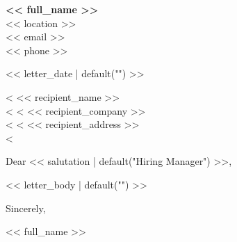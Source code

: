 \documentclass[11pt,a4paper]{article}
\begin{document}
\begin{flushleft}
{\large\bfseries << full_name >>}\\[2pt]
<< location >>\\
<< email >>\\
<< phone >>
\end{flushleft}

\vspace{12pt}

<< letter_date | default("") >>

\vspace{12pt}

<%
<< recipient_name >>\\
<%
<%
<< recipient_company >>\\
<%
<%
<< recipient_address >>\\
<%

\vspace{12pt}

Dear << salutation | default("Hiring Manager") >>,

\vspace{8pt}

<< letter_body | default("") >>

\vspace{8pt}

Sincerely,

\vspace{24pt}

<< full_name >>
\end{document}
